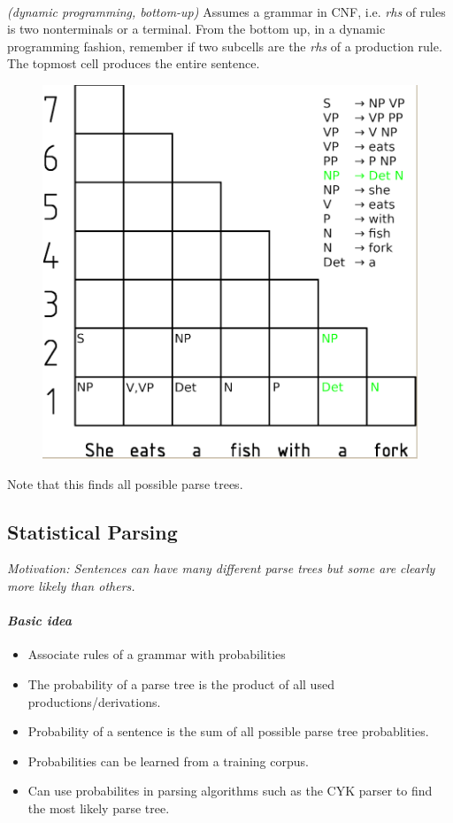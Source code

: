 \documentclass[10pt,twocolumn]{article}
\begin{document}
\paragraph{ } \textit{(dynamic programming, bottom-up)} Assumes
a grammar in CNF, i.e. \textit{rhs} of rules is two nonterminals or a terminal.
From the bottom up, in a dynamic programming fashion, remember if two subcells
are the \textit{rhs} of a production rule. The topmost cell produces the entire sentence.
\begin{figure}
  \centering
  \includegraphics[width=0.4\linewidth]{cyk-parsing}
\end{figure}
Note that this finds all possible parse trees.

\subsection{Statistical Parsing}

\textit{Motivation: Sentences can have many different parse trees but some are
  clearly more likely than others.}

\paragraph{\textit{Basic idea}}
\begin{itemize}
\item Associate rules of a grammar with probabilities
\item The probability of a parse tree is the product of all used
  productions/derivations.
\item Probability of a sentence is the sum of all possible parse tree
  probablities.
\item Probabilities can be learned from a training corpus.
\item Can use probabilites in parsing algorithms such as the CYK parser to find
  the most likely parse tree.
\end{itemize}
\end{document}
